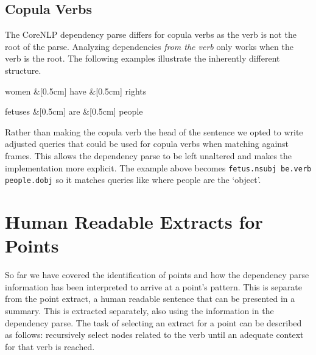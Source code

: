     \tocless\subsection{Copula Verbs}
    The CoreNLP dependency parse differs for copula verbs as the verb is not the root of the parse. Analyzing dependencies \textit{from the verb} only works when the verb is the root. The following examples illustrate the inherently different structure.
      \begin{multicols}{2}
        \raggedcolumns
        \begin{center}
          \begin{dependency}[edge horizontal padding=0]
            \begin{deptext}
              women \&[0.5cm] have \&[0.5cm] rights \\
            \end{deptext}
          \end{dependency}
        \end{center}
        \columnbreak
        \begin{center}
          \begin{dependency}[edge horizontal padding=0]
            \begin{deptext}
              fetuses \&[0.5cm] are \&[0.5cm] people \\
            \end{deptext}
          \end{dependency}
        \end{center}
      \end{multicols}

      Rather than making the copula verb the head of the sentence we opted to write adjusted queries that could be used for copula verbs when matching against frames. This allows the dependency parse to be left unaltered and makes the implementation more explicit. The example above becomes \texttt{fetus.nsubj be.verb people.dobj} so it matches queries like where people are the `object'.

  \section{Human Readable Extracts for Points}
  So far we have covered the identification of points and how the dependency parse information has been interpreted to arrive at a point's pattern. This is separate from the point extract, a human readable sentence that can be presented in a summary. This is extracted separately, also using the information in the dependency parse. The task of selecting an extract for a point can be described as follows: recursively select nodes related to the verb until an adequate context for that verb is reached.

